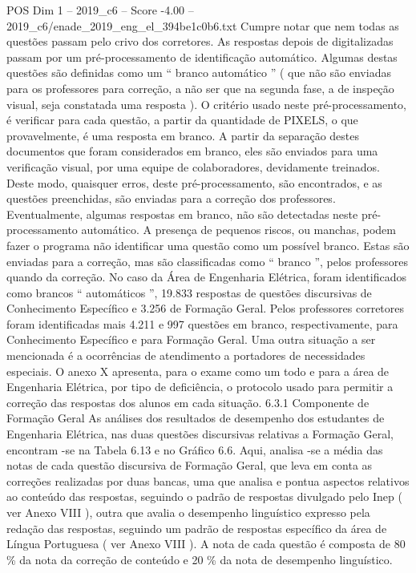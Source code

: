 \begin{textsample}{POS Dim 1 – 2019\_c6 – Score -4.00 – 2019\_c6/enade\_2019\_eng\_el\_394be1c0b6.txt}
Cumpre notar que nem todas as questões passam pelo crivo dos corretores.
As respostas depois de digitalizadas passam por um pré-processamento de identificação automático.
Algumas destas questões são definidas como um “ branco automático ” ( que não são enviadas para os professores para correção, a não ser que na segunda fase, a de inspeção visual, seja constatada uma resposta ).
O critério usado neste pré-processamento, é verificar para cada questão, a partir da quantidade de PIXELS, o que provavelmente, é uma resposta em branco.
A partir da separação destes documentos que foram considerados em branco, eles são enviados para uma verificação visual, por uma equipe de colaboradores, devidamente treinados.
Deste modo, quaisquer erros, deste pré-processamento, são encontrados, e as questões preenchidas, são enviadas para a correção dos professores.
Eventualmente, algumas respostas em branco, não são detectadas neste pré-processamento automático.
A presença de pequenos riscos, ou manchas, podem fazer o programa não identificar uma questão como um possível branco.
Estas são enviadas para a correção, mas são classificadas como “ branco ”, pelos professores quando da correção.
No caso da Área de Engenharia Elétrica, foram identificados como brancos “ automáticos ”, 19.833 respostas de questões discursivas de Conhecimento Específico e 3.256 de Formação Geral.
Pelos professores corretores foram identificadas mais 4.211 e 997 questões em branco, respectivamente, para Conhecimento Específico e para Formação Geral.
Uma outra situação a ser mencionada é a ocorrências de atendimento a portadores de necessidades especiais.
O anexo X apresenta, para o exame como um todo e para a área de Engenharia Elétrica, por tipo de deficiência, o protocolo usado para permitir a correção das respostas dos alunos em cada situação. 6.3.1 Componente de Formação Geral As análises dos resultados de desempenho dos estudantes de Engenharia Elétrica, nas duas questões discursivas relativas a Formação Geral, encontram -se na Tabela 6.13 e no Gráfico 6.6.
Aqui, analisa -se a média das notas de cada questão discursiva de Formação Geral, que leva em conta as correções realizadas por duas bancas, uma que analisa e pontua aspectos relativos ao conteúdo das respostas, seguindo o padrão de respostas divulgado pelo Inep ( ver Anexo VIII ), outra que avalia o desempenho linguístico expresso pela redação das respostas, seguindo um padrão de respostas específico da área de Língua Portuguesa ( ver Anexo VIII ).
A nota de cada questão é composta de 80 \% da nota da correção de conteúdo e 20 \% da nota de desempenho linguístico.

\end{textsample}
